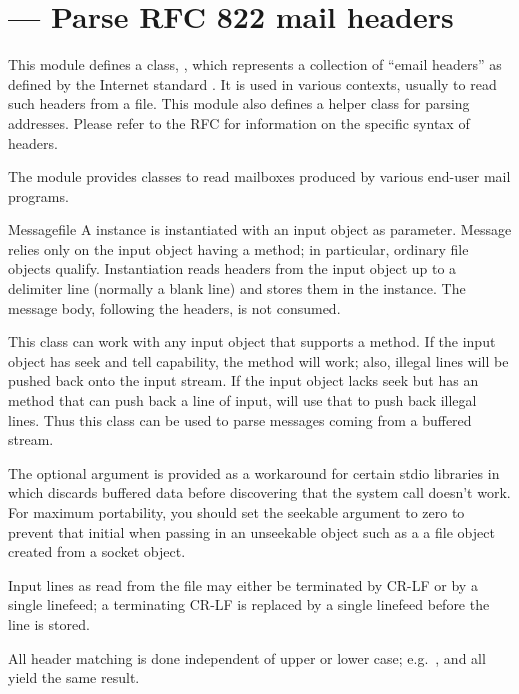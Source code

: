\section{ ---
         Parse RFC 822 mail headers}


This module defines a class, , which represents a
collection of ``email headers'' as defined by the Internet standard
.  It is used in various contexts, usually to read such
headers from a file.  This module also defines a helper class 
 for parsing  addresses.  Please refer to
the RFC for information on the specific syntax of  headers.

The  module provides classes 
to read mailboxes produced by various end-user mail programs.

\begin{classdesc}{Message}{file}
A  instance is instantiated with an input object as
parameter.  Message relies only on the input object having a
 method; in particular, ordinary file objects
qualify.  Instantiation reads headers from the input object up to a
delimiter line (normally a blank line) and stores them in the
instance.  The message body, following the headers, is not consumed.

This class can work with any input object that supports a
 method.  If the input object has seek and tell
capability, the  method will work; also, illegal
lines will be pushed back onto the input stream.  If the input object
lacks seek but has an  method that can push back a
line of input,  will use that to push back illegal
lines.  Thus this class can be used to parse messages coming from a
buffered stream.

The optional  argument is provided as a workaround for
certain stdio libraries in which  discards buffered
data before discovering that the  system call
doesn't work.  For maximum portability, you should set the seekable
argument to zero to prevent that initial  when passing
in an unseekable object such as a a file object created from a socket
object.

Input lines as read from the file may either be terminated by CR-LF or
by a single linefeed; a terminating CR-LF is replaced by a single
linefeed before the line is stored.

All header matching is done independent of upper or lower case;
e.g.\ ,  and
 all yield the same result.
\end{classdesc}

